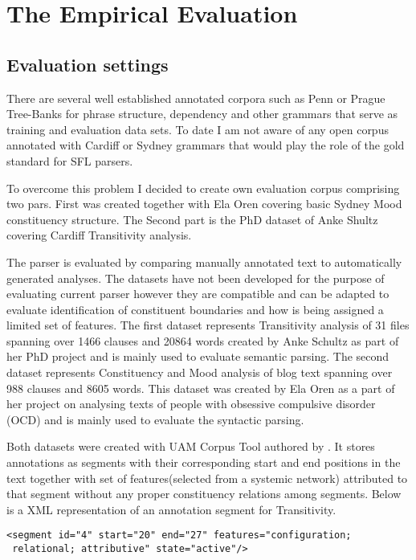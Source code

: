 \chapter{The Empirical Evaluation}
\label{ch:evaluation}
\section{Evaluation settings}
There are several well established annotated corpora such as Penn or Prague Tree-Banks for phrase structure, dependency and other grammars that serve as training and evaluation data sets. To date I am not aware of any open corpus annotated with Cardiff or Sydney grammars that would play the role of the gold standard for SFL parsers. 

To overcome this problem I decided to create own evaluation corpus comprising two pars. First was created together with Ela Oren covering basic Sydney Mood constituency structure. The Second part is the PhD dataset of Anke Shultz covering Cardiff Transitivity analysis. %

The parser is evaluated by comparing manually annotated text to automatically generated analyses.
The datasets have not been developed for the purpose of evaluating current parser however they are compatible and can be adapted to evaluate identification of constituent boundaries and how is being assigned a limited set of features. The first dataset represents Transitivity analysis of 31 files spanning over 1466 clauses and 20864 words created by Anke Schultz as part of her PhD project and is mainly used to evaluate semantic parsing. The second dataset represents Constituency and Mood analysis of blog text spanning over 988 clauses and 8605 words. This dataset was created by Ela Oren as a part of her project on analysing texts of people with obsessive compulsive disorder (OCD) and is mainly used to evaluate the syntactic parsing.  

Both datasets were created with UAM Corpus Tool authored by \citet{ODonnell2008,ODonnell2008a}. It stores annotations as segments with their corresponding start and end positions in the text together with set of features(selected from a systemic network) attributed to that segment without any proper constituency relations among segments. Below is a XML representation of an annotation  segment for Transitivity.

\begin{verbatim}
<segment id="4" start="20" end="27" features="configuration;
 relational; attributive" state="active"/>
\end{verbatim}

